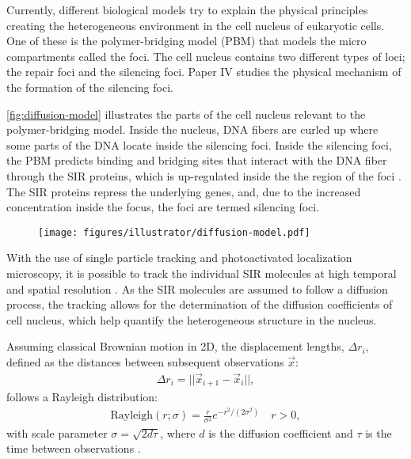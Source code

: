 Currently, different biological models try to explain the physical principles creating the heterogeneous environment in the cell nucleus of eukaryotic cells.
One of these is the polymer-bridging model (PBM) that models the micro compartments called the foci. The cell nucleus contains two different types of loci; the repair foci and the silencing foci. Paper IV studies the physical mechanism of the formation of the silencing foci.

\autoref{fig:diffusion-model} illustrates the parts of the cell nucleus relevant to the polymer-bridging model. Inside the nucleus, DNA fibers are curled up where some parts of the DNA locate inside the silencing foci. Inside the silencing foci, the PBM predicts binding and bridging sites that interact with the DNA fiber through the SIR proteins, which is up-regulated inside the the region of the foci \autocite{heltbergPhysicalObservablesDetermine2021}. The SIR proteins repress the underlying genes, and, due to the increased concentration inside the focus, the foci are termed silencing foci.

\begin{figure}[htbp]
    \centering
    \texttt{[image: figures/illustrator/diffusion-model.pdf]}
\end{figure}

With the use of single particle tracking and photoactivated localization microscopy, it is possible to track the individual SIR molecules at high temporal and spatial resolution \autocite{oswaldImagingQuantificationTransmembrane2014,manleyHighdensityMappingSinglemolecule2008}. As the SIR molecules are assumed to follow a diffusion process, the tracking allows for the determination of the diffusion coefficients of cell nucleus, which help quantify the heterogeneous structure in the nucleus.

Assuming classical Brownian motion in 2D, the displacement lengths, $\Delta r_i$, defined as the distances between subsequent observations $\vec{x}$:
\begin{align}
    \Delta r_i = || \vec{x}_{i+1} - \vec{x}_{i} ||,
\end{align}
follows a Rayleigh distribution:
\begin{align}
    \mathrm{Rayleigh}(r; \sigma) =\frac{r}{\sigma^2} e^{-r^2/(2\sigma^2)} \quad r>0,
\end{align}
with scale parameter $\sigma = \sqrt{2d\tau}$, where $d$ is the diffusion coefficient and $\tau$ is the time between observations \autocite{bakerInferenceDiffusionCoefficients2021,andersonTrackingCellSurface1992}
.


